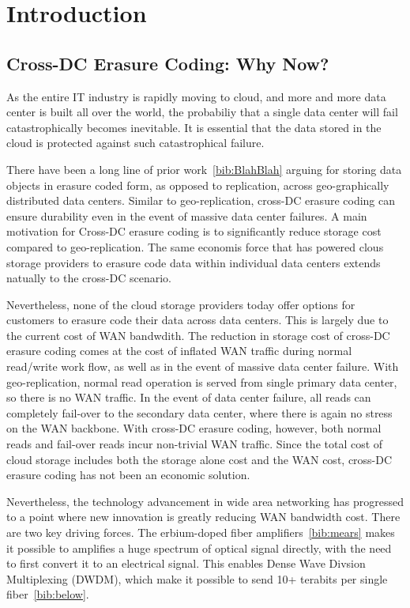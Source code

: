 \section{Introduction}

\subsection{Cross-DC Erasure Coding: Why Now?}

As the entire IT industry is rapidly moving to cloud, and more and more data center is built all over the world, the probabiliy that a single data center will fail catastrophically becomes inevitable. It is essential that the data stored in the cloud is protected against such catastrophical failure. 

There have been a long line of prior work~\ref{bib:BlahBlah} arguing for storing data objects in erasure coded form, as opposed to replication, across geo-graphically distributed data centers. Similar to geo-replication, cross-DC erasure coding can ensure durability even in the event of massive data center failures. A main motivation for Cross-DC erasure coding is to significantly reduce storage cost compared to geo-replication. The same economis force that has powered clous storage providers to erasure code data within individual data centers extends natually to the cross-DC scenario.

Nevertheless, none of the cloud storage providers today offer options for customers to erasure code their data across data centers. This is largely due to the current cost of WAN bandwdith. The reduction in storage cost of cross-DC erasure coding comes at the cost of inflated WAN traffic during normal read/write work flow, as well as in the event of massive data center failure. With geo-replication, normal read operation is served from single primary data center, so there is no WAN traffic. In the event of data center failure, all reads can completely fail-over to the secondary data center, where there is again no stress on the WAN backbone. With cross-DC erasure coding, however, both normal reads and fail-over reads incur non-trivial WAN traffic. Since the total cost of cloud storage includes both the storage alone cost and the WAN cost, cross-DC erasure coding has not been an economic solution.

Nevertheless, the technology advancement in wide area networking has progressed to a point where new innovation is greatly reducing WAN bandwidth cost. There are two key driving forces. The erbium-doped fiber amplifiers~\ref{bib:mears} makes it possible to amplifies a huge spectrum of optical signal directly, with the need to first convert it to an electrical signal. This enables Dense Wave Divsion Multiplexing (DWDM), which make it possible to send 10+ terabits per single fiber~\ref{bib:below}. 

